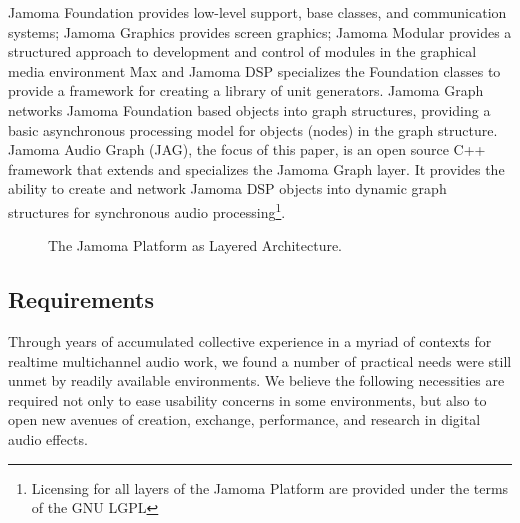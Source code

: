 \documentclass[twoside,a4paper]{article}
\begin{document}
Jamoma Foundation provides low-level support, base classes, and communication systems; Jamoma Graphics provides screen graphics; Jamoma Modular provides a structured approach to development and control of modules in the graphical media environment Max \cite{Place:2006} and Jamoma DSP specializes the Foundation classes to provide a framework for creating a library of unit generators. 
Jamoma Graph networks Jamoma Foundation based objects into graph structures, providing a basic asynchronous processing model for objects (nodes) in the graph structure. 
Jamoma Audio Graph (JAG), the focus of this paper, is an open source C++ framework that extends and specializes the Jamoma Graph layer.  It provides the ability to create and network Jamoma DSP objects into dynamic graph structures for synchronous audio processing\footnote{Licensing for all layers of the Jamoma Platform are provided under the terms of the GNU LGPL}.  


\begin{figure}[htbp]
\centerline{}
\caption{The Jamoma Platform as Layered Architecture.}
\label{fig:layers}
\end{figure}


\subsection{Requirements}

Through years of accumulated collective experience in a myriad of contexts for realtime multichannel audio work, we found a number of practical needs were still unmet by readily available environments.  We believe the following necessities are required not only to ease usability concerns in some environments, but also to open new avenues of creation, exchange, performance, and research in digital audio effects.
\end{document}
